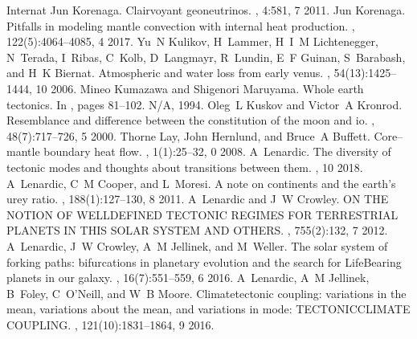 \documentclass[letterpaper,10pt,english]{jupyterBook}
\begin{document}
\begin{sphinxthebibliography}{Internat}
Jun Korenaga. Clairvoyant geoneutrinos. , 4:581, 7 2011.
\sphinxAtStartPar
Jun Korenaga. Pitfalls in modeling mantle convection with internal heat production. , 122(5):4064–4085, 4 2017.
\sphinxAtStartPar
Yu N Kulikov, H Lammer, H I M Lichtenegger, N Terada, I Ribas, C Kolb, D Langmayr, R Lundin, E F Guinan, S Barabash, and H K Biernat. Atmospheric and water loss from early venus. , 54(13):1425–1444, 10 2006.
\sphinxAtStartPar
Mineo Kumazawa and Shigenori Maruyama. Whole earth tectonics. In , pages 81–102. N/A, 1994.
\sphinxAtStartPar
Oleg L Kuskov and Victor A Kronrod. Resemblance and difference between the constitution of the moon and io. , 48(7):717–726, 5 2000.
\sphinxAtStartPar
Thorne Lay, John Hernlund, and Bruce A Buffett. Core–mantle boundary heat flow. , 1(1):25–32, 0 2008.
\sphinxAtStartPar
A Lenardic. The diversity of tectonic modes and thoughts about transitions between them. , 10 2018.
\sphinxAtStartPar
A Lenardic, C M Cooper, and L Moresi. A note on continents and the earth's urey ratio. , 188(1):127–130, 8 2011.
\sphinxAtStartPar
A Lenardic and J W Crowley. ON THE NOTION OF WELL\sphinxhyphen{}DEFINED TECTONIC REGIMES FOR TERRESTRIAL PLANETS IN THIS SOLAR SYSTEM AND OTHERS. , 755(2):132, 7 2012.
\sphinxAtStartPar
A Lenardic, J W Crowley, A M Jellinek, and M Weller. The solar system of forking paths: bifurcations in planetary evolution and the search for Life\sphinxhyphen{}Bearing planets in our galaxy. , 16(7):551–559, 6 2016.
\sphinxAtStartPar
A Lenardic, A M Jellinek, B Foley, C O'Neill, and W B Moore. Climate\sphinxhyphen{}tectonic coupling: variations in the mean, variations about the mean, and variations in mode: TECTONIC\sphinxhyphen{}CLIMATE COUPLING. , 121(10):1831–1864, 9 2016.

\end{sphinxthebibliography}
\end{document}

